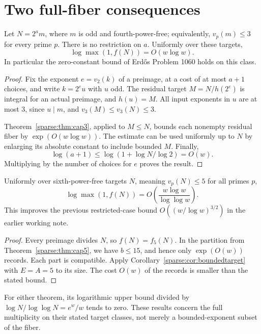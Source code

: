 \section{Two full-fiber consequences}
\begin{theorem}\label{sparse:thm:unboundedtwo}
Let $N=2^a m$, where $m$ is odd and fourth-power-free; equivalently, $v_p(m)\le3$ for every prime $p$. There is no restriction on $a$. Uniformly over these targets,
\[
 \boxed{\log\max(1,f(N))=O(w\log w).}
\]
In particular the zero-constant bound of Erd\H{o}s Problem 1060 holds on this class.
\end{theorem}
\begin{proof}
Fix the exponent $e=v_2(k)$ of a preimage, at a cost of at most $a+1$ choices, and write $k=2^e u$ with $u$ odd. The residual target $M=N/h(2^e)$ is integral for an actual preimage, and $h(u)=M$. All input exponents in $u$ are at most $3$, since $u\mid m$, and $v_3(M)\le v_3(N)\le3$.

Theorem~\ref{sparse:thm:cap3}, applied to $M\le N$, bounds each nonempty residual fiber by $\exp(O(w\log w))$. The estimate can be used uniformly up to $N$ by enlarging its absolute constant to include bounded $M$. Finally,
\[
 \log(a+1)\le\log(1+\log N/\log2)=O(w).
\]
Multiplying by the number of choices for $e$ proves the result.
\end{proof}

\begin{theorem}\label{sparse:thm:sixth}
Uniformly over sixth-power-free targets $N$, meaning $v_p(N)\le5$ for all primes $p$,
\[
 \boxed{\log\max(1,f(N))
 =O\!\left(\frac{w\log w}{\log\log w}\right).}
\]
This improves the previous restricted-case bound $O((w/\log w)^{3/2})$ in the earlier working note.
\end{theorem}
\begin{proof}
Every preimage divides $N$, so $f(N)=f_5(N)$. In the partition from Theorem~\ref{sparse:thm:cap5}, we have $b\le15$, and hence only $\exp(O(w))$ records. Each part is compatible. Apply Corollary~\ref{sparse:cor:boundedtarget} with $E=A=5$ to its size. The cost $O(w)$ of the records is smaller than the stated bound.
\end{proof}

For either theorem, its logarithmic upper bound divided by $\log N/\log\log N=e^w/w$ tends to zero. These results concern the full multiplicity on their stated target classes, not merely a bounded-exponent subset of the fiber.

